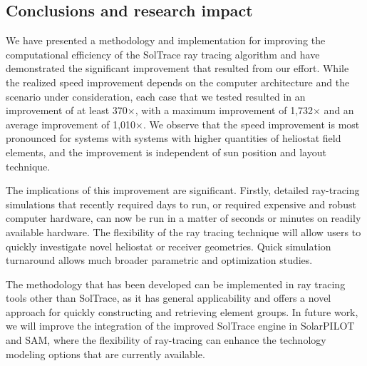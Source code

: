 \documentclass[11pt,letterpaper]{article}
\begin{document}
\subsection{Conclusions and research impact}
We have presented a methodology and implementation for improving the computational efficiency of the SolTrace ray tracing algorithm and have demonstrated the significant improvement that resulted from our effort. 
While the realized speed improvement depends on the computer architecture and the scenario under consideration, each case that we tested resulted in an improvement of at least 370$\times$, with a maximum improvement of 1,732$\times$ and an average improvement of 1,010$\times$. 
We observe that the speed improvement is most pronounced for systems with systems with higher quantities of heliostat field elements, and the improvement is independent of sun position and layout technique. 

The implications of this improvement are significant. 
Firstly, detailed ray-tracing simulations that recently required days to run, or required expensive and robust computer hardware, can now be run in a matter of seconds or minutes on readily available hardware. 
The flexibility of the ray tracing technique will allow users to quickly investigate novel heliostat or receiver geometries. 
Quick simulation turnaround allows much broader parametric and optimization studies. 

The methodology that has been developed can be implemented in ray tracing tools other than SolTrace, as it has general applicability and offers a novel approach for quickly constructing and retrieving element groups. 
In future work, we will improve the integration of the improved SolTrace engine in SolarPILOT and SAM, where the flexibility of ray-tracing can enhance the technology modeling options that are currently available. 
\end{document}
